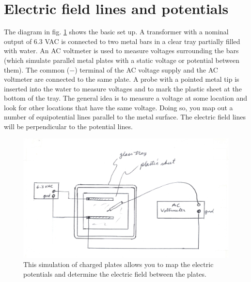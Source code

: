 \section{Electric field lines and potentials}
The diagram in fig. \ref{f:fig1} shows the basic set up.  A transformer with a nominal output of 6.3 VAC is connected to two metal bars in a clear tray partially filled with water.  An AC voltmeter is used to measure voltages surrounding the bars (which simulate parallel metal plates with a static voltage or potential between them).  The common ($-$) terminal of the AC voltage supply and the AC voltmeter are connected to the same plate.  A probe with a pointed metal tip is inserted into the water to measure voltages and to mark the plastic sheet at the bottom of the tray.  The general idea is to measure a voltage at some location and look for other locations that have the same voltage.  Doing so, you map out a number of equipotential lines parallel to the metal surface. The electric field lines will be perpendicular to the potential lines.

\begin{figure}
	\centering
	\includegraphics[scale=0.6]{5bgraf/fig_1}
	\caption{This simulation of charged plates allows you to map the electric potentials and determine the electric field between the plates.}
	\label{f:fig1}
\end{figure}

